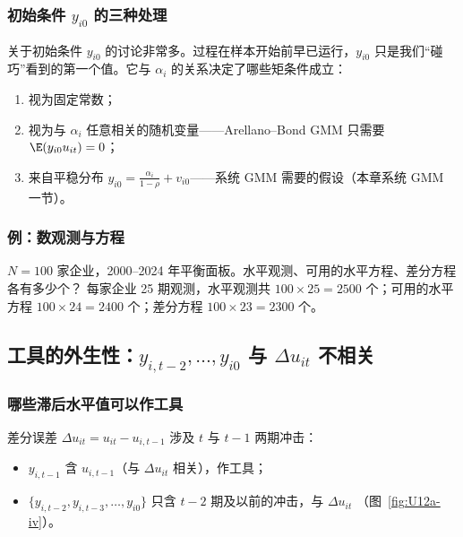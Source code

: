 \subsubsection{初始条件 \texorpdfstring{$y_{i0}$}{y\_i0} 的三种处理}

关于初始条件 $y_{i0}$ 的讨论非常多。过程在样本开始前早已运行，$y_{i0}$ 只是我们“碰巧”看到的第一个值。它与 $\alpha_i$ 的关系决定了哪些矩条件成立：
\begin{enumerate}
  \item 视为固定常数；
  \item 视为与 $\alpha_i$ 任意相关的随机变量——Arellano–Bond GMM 只需要 $\E(y_{i0}u_{it})=0$；
  \item 来自平稳分布 $y_{i0}=\frac{\alpha_i}{1-\rho}+v_{i0}$——系统 GMM 需要的假设（本章系统 GMM 一节）。
\end{enumerate}

\subsubsection{例：数观测与方程}

\begin{exmp}[数观测]\label{ex:U12a-count}
$N=100$ 家企业，2000–2024 年平衡面板。水平观测、可用的水平方程、差分方程各有多少个？
\solution 每家企业 25 期观测，水平观测共 $100\times25=2500$ 个；可用的水平方程 $100\times24=2400$ 个；差分方程 $100\times23=2300$ 个。
\end{exmp}

\subsection{工具的外生性：\texorpdfstring{$y_{i,t-2},\dots,y_{i0}$}{y\_(i,t-2),...,y\_i0} 与 \texorpdfstring{$\Delta u_{it}$}{Delta u\_it} 不相关}\label{sec:U12a-exogiv}

\subsubsection{哪些滞后水平值可以作工具}

差分误差 $\Delta u_{it}=u_{it}-u_{i,t-1}$ 涉及 $t$ 与 $t-1$ 两期冲击：
\begin{itemize}
  \item $y_{i,t-1}$ 含 $u_{i,t-1}$（与 $\Delta u_{it}$ 相关），作工具；
  \item $\{y_{i,t-2},y_{i,t-3},\dots,y_{i0}\}$ 只含 $t-2$ 期及以前的冲击，与 $\Delta u_{it}$ （图~\ref{fig:U12a-iv}）。
\end{itemize}

